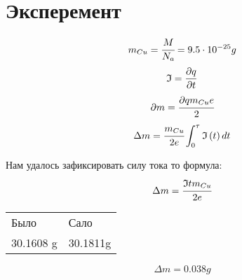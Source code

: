 \section{Эксперемент}

\begin{equation}
    m_{Cu} = \cfrac{M}{N_a} = 9.5\cdot10^{-25} g
\end{equation}
\begin{equation}
    \mathfrak{I} = \frac{\partial q}{\partial t}
\end{equation}
\begin{equation}
    \partial m = \cfrac{\partial qm_{Cu}e}{2}
\end{equation}
\begin{equation}
    \Delta m = \cfrac{m_{Cu}}{2e}\int_{0}^{\tau}  \mathfrak{I}\left( t \right) dt 
\end{equation}

Нам удалось зафиксировать силу тока то формула:
\begin{equation}
    \Delta m = \cfrac{\mathfrak{I}tm_{Cu}}{2e}
\end{equation}
\begin{center}
    \begin{tabular}{l||l}
        Было & Сало \\
        30.1608 g & 30.1811g
     \end{tabular}
\end{center}

\begin{equation}
    \Delta m = 0.038 g
\end{equation}





